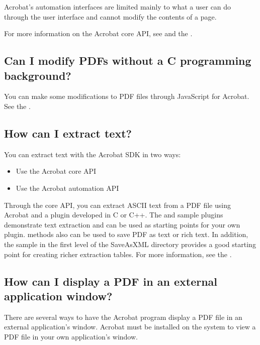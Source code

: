 \documentclass[letterpaper,12pt,english,openany,oneside]{sphinxmanual}
\begin{document}
Acrobat’s automation interfaces are limited mainly to what a user can do through the user interface and cannot modify the contents of a page.

For more information on the Acrobat core API, see  and the  .


\subsection{Can I modify PDFs without a C programming background?}
\label{\detokenize{apxDevFAQ:can-i-modify-pdfs-without-a-c-programming-background}}
You can make some modifications to PDF files through JavaScript for Acrobat. See the  .




\subsection{How can I extract text?}
\label{\detokenize{apxDevFAQ:how-can-i-extract-text}}
You can extract text with the Acrobat SDK in two ways:
\begin{itemize}
\item {} 
Use the Acrobat core API

\item {} 
Use the Acrobat automation API

\end{itemize}

Through the core API, you can extract ASCII text from a PDF file using Acrobat and a plug\sphinxhyphen{}in developed in C or C++. The  and  sample plug\sphinxhyphen{}ins demonstrate text extraction and can be used as starting points for your own plug\sphinxhyphen{}in.  methods also can be used to save PDF as text or rich text. In addition, the  sample in the first level of the SaveAsXML directory provides a good starting point for creating richer extraction tables. For more information, see the  .




\subsection{How can I display a PDF in an external application window?}
\label{\detokenize{apxDevFAQ:how-can-i-display-a-pdf-in-an-external-application-window}}
There are several ways to have the Acrobat program display a PDF file in an external application’s window. Acrobat must be installed on the system to view a PDF file in your own application’s window.
\end{document}
